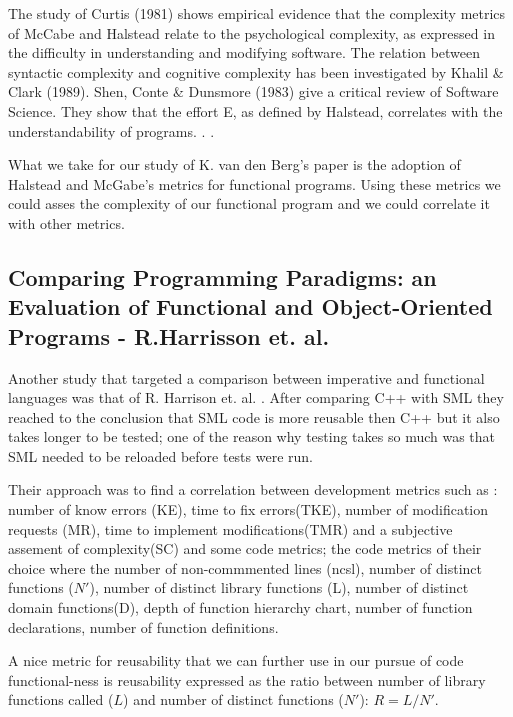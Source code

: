 \documentclass{article}
\begin{document}
The study of Curtis (1981) shows empirical evidence that the complexity metrics of McCabe and Halstead relate to the psychological complexity, as expressed in the difficulty in understanding and modifying software. The relation between syntactic complexity and cognitive complexity has been investigated by Khalil \& Clark (1989). Shen, Conte \& Dunsmore (1983) give a critical review of Software Science. They show that the effort E, as defined by Halstead, correlates with the understandability of programs. . \cite{DBLP:journals/infsof/BergB95}. \par

What we take for our study of  K. van den Berg's paper is the adoption of Halstead and McGabe's metrics for functional programs. Using these metrics we could asses the complexity of our functional program and we could correlate it with other metrics. 

\subsection{Comparing Programming Paradigms: an Evaluation of Functional and Object-Oriented Programs - R.Harrisson et. al.}
Another study that targeted a comparison between imperative and functional languages was that of R. Harrison et. al. \cite{eps250597} . After comparing C++ with SML they reached to the conclusion that SML code is more reusable then C++ but it also takes longer to be tested; one of the reason why testing takes so much was that SML needed to be reloaded before tests were run. \par

Their approach was to find a correlation between development metrics such as : number of know errors (KE), time to fix errors(TKE), number of modification requests (MR), time to implement modifications(TMR) and a subjective assement of complexity(SC) and some code metrics; the code metrics of their choice where the number of non-commmented lines (ncsl), number of distinct functions ($N'$), number of distinct library functions (L), number of distinct domain functions(D), depth of function hierarchy chart, number of function declarations, number of function definitions. \par

A nice metric for reusability that we can further use in our pursue of code functional-ness is reusability expressed as the ratio between number of library functions called ($L$) and number of distinct functions ($N'$): $R = L / N'$. \par
\end{document}
